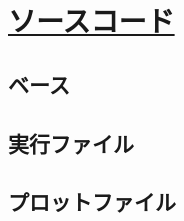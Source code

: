\chapter{\href{https://github.com/m-agnet/Report.git}{ソースコード}}
\section{ベース}

\section{実行ファイル}

\section{プロットファイル}

